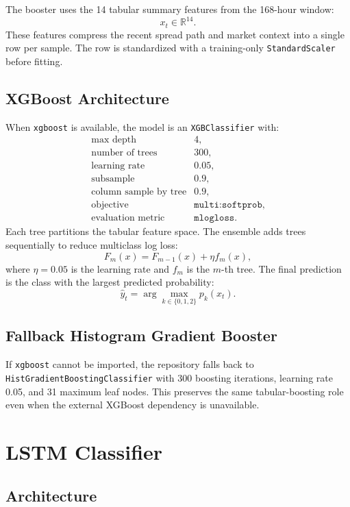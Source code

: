 \documentclass[11pt]{article}
\begin{document}
The booster uses the 14 tabular summary features from the 168-hour window:
\[
x_t \in \mathbb{R}^{14}.
\]
These features compress the recent spread path and market context into a
single row per sample. The row is standardized with a training-only
\texttt{StandardScaler} before fitting.

\subsection{XGBoost Architecture}

When \texttt{xgboost} is available, the model is an
\texttt{XGBClassifier} with:
\[
\begin{array}{ll}
\text{max depth} & 4,\\
\text{number of trees} & 300,\\
\text{learning rate} & 0.05,\\
\text{subsample} & 0.9,\\
\text{column sample by tree} & 0.9,\\
\text{objective} & \texttt{multi:softprob},\\
\text{evaluation metric} & \texttt{mlogloss}.
\end{array}
\]
Each tree partitions the tabular feature space. The ensemble adds trees
sequentially to reduce multiclass log loss:
\[
F_m(x) = F_{m-1}(x) + \eta f_m(x),
\]
where \(\eta=0.05\) is the learning rate and \(f_m\) is the \(m\)-th tree.
The final prediction is the class with the largest predicted probability:
\[
\hat{y}_t = \arg\max_{k \in \{0,1,2\}} p_k(x_t).
\]

\subsection{Fallback Histogram Gradient Booster}

If \texttt{xgboost} cannot be imported, the repository falls back to
\texttt{HistGradientBoostingClassifier} with 300 boosting iterations,
learning rate 0.05, and 31 maximum leaf nodes. This preserves the same
tabular-boosting role even when the external XGBoost dependency is unavailable.

\section{LSTM Classifier}

\subsection{Architecture}
\end{document}
